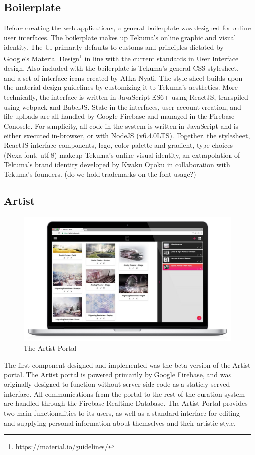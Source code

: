 \documentclass[fontsize=12pt]{scrartcl} %
\numberwithin{equation}{section} %
\numberwithin{figure}{section} %
\numberwithin{table}{section} %
\begin{document}
\subsection{Boilerplate}
Before creating the web applications, a general boilerplate was designed for online user interfaces. The boilerplate makes up Tekuma’s online graphic and visual identity. The UI primarily defaults to customs and principles dictated by Google’s Material Design\footnote{ https://material.io/guidelines/ } in line with the current standards in User Interface design. Also included with the boilerplate is Tekuma’s general CSS stylesheet, and a set of interface icons created by Afika Nyati. The style sheet builds upon the material design guidelines by customizing it to Tekuma’s aesthetics. More technically, the interface is written in JavaScript ES6+ using ReactJS, transpiled using webpack and BabelJS. State in the interfaces, user account creation, and file uploads are all handled by Google Firebase and managed in the Firebase Conosole. For simplicity, all code in the system is written in JavaScript and is either executed in-browser, or with NodeJS (v6.4.0LTS). Together, the stylesheet, ReactJS interface components, logo, color palette and gradient, type choices (Nexa font, utf-8) makeup Tekuma’s online visual identity, an extrapolation of Tekuma’s brand identity developed by Kwaku Opoku in collaboration with Tekuma’s founders. (do we hold trademarks on the font usage?)


\subsection{Artist}
\begin{figure}
    \includegraphics[scale=0.2]{./img/artist.jpg}
    \caption{The Artist Portal}
    \label{}
\end{figure}
The first component designed and implemented was the beta version of the Artist portal. The Artist portal is powered primarily by Google Firebase, and was originally designed to function without server-side code as a staticly served interface. All communications from the portal to the rest of the curation system are handled through the Firebase Realtime Database. The Artist Portal provides two main functionalities to its users, as well as a standard interface for editing and supplying personal information about themselves and their artistic style.\\
\end{document}
